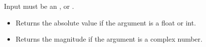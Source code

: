Input must be an ,  or .

\begin{itemize}
  \item Returns the absolute value if the argument is a float or int.
  \item Returns the magnitude if the argument is a complex number.
\end{itemize}
